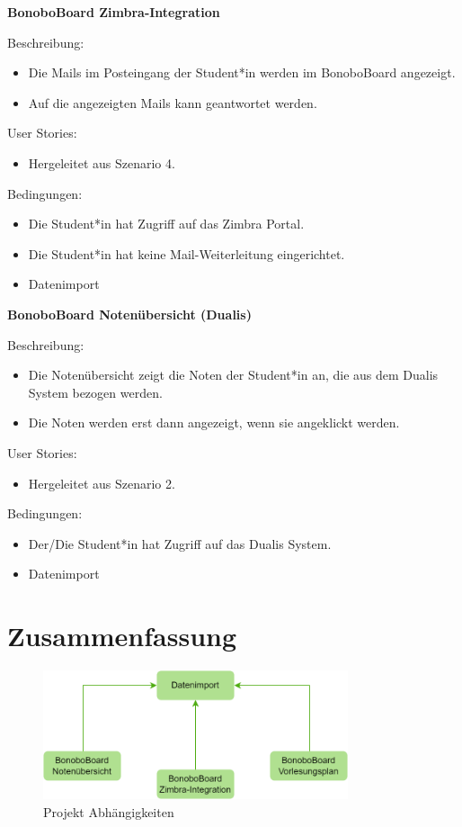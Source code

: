 \documentclass[a4paper,11pt]{scrartcl}
\begin{document}
\noindent\textbf{BonoboBoard Zimbra-Integration} \par\noindent	
Beschreibung: 
\begin{itemize}
\item Die Mails im Posteingang der Student*in werden im BonoboBoard angezeigt.
\item Auf die angezeigten Mails kann geantwortet werden.
\end{itemize}

User Stories: 
\begin{itemize}
\item Hergeleitet aus Szenario 4.
\end{itemize}

Bedingungen: 
\begin{itemize}
\item Die Student*in hat Zugriff auf das Zimbra Portal.
\item Die Student*in hat keine Mail-Weiterleitung eingerichtet.
\item Datenimport
\end{itemize}
\newpage

\noindent\textbf{BonoboBoard Notenübersicht (Dualis)} \par\noindent	
Beschreibung: 
\begin{itemize}
\item 	Die Notenübersicht zeigt die Noten der Student*in an, die aus dem Dualis System bezogen werden.
\item 	Die Noten werden erst dann angezeigt, wenn sie angeklickt werden.
\end{itemize}

User Stories: 
\begin{itemize}
\item Hergeleitet aus Szenario 2.
\end{itemize}

Bedingungen: 
\begin{itemize}
\item Der/Die Student*in hat Zugriff auf das Dualis System.
\item Datenimport
\end{itemize}
	
\section{Zusammenfassung}
\begin{figure}[H]
\begin{center}
\includegraphics[width=0.8\textwidth]{Dependencies}
\caption{Projekt Abhängigkeiten}
\label{img:Dependencies}
\end{center}
\end{figure}
\end{document}
